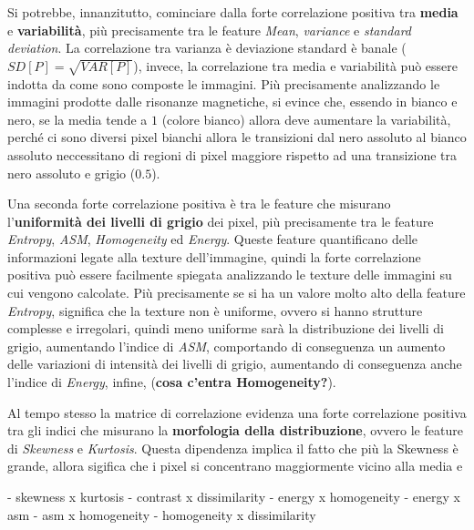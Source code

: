 Si potrebbe, innanzitutto, cominciare dalla forte correlazione positiva
tra \textbf{media} e \textbf{variabilità}, più precisamente tra le feature \textit{Mean},
\textit{variance} e \textit{standard deviation}. La correlazione tra varianza è 
deviazione standard è banale ($SD[P] = \sqrt{VAR[P]}$), invece, la correlazione tra media 
e variabilità può essere indotta da come sono composte le immagini. Più precisamente 
analizzando le immagini prodotte dalle risonanze magnetiche, si evince che, essendo in 
bianco e nero, se la media tende a $1$ (colore bianco) allora deve aumentare la 
variabilità, perché ci sono diversi pixel bianchi allora le transizioni dal nero assoluto
al bianco assoluto neccessitano di regioni di pixel maggiore rispetto ad una 
transizione tra nero assoluto e grigio ($0.5$). 

Una seconda forte correlazione positiva è 
tra le feature che misurano l'\textbf{uniformità dei livelli di grigio} dei pixel,
più precisamente tra le feature \textit{Entropy}, \textit{ASM}, \textit{Homogeneity} 
ed \textit{Energy}. Queste feature quantificano delle informazioni legate alla
texture dell'immagine, quindi la forte correlazione positiva può essere facilmente
spiegata analizzando le texture delle immagini su cui vengono calcolate. Più precisamente
se si ha un valore molto alto della feature \textit{Entropy}, significa che la
texture non è uniforme, ovvero si hanno strutture complesse e irregolari, quindi
meno uniforme sarà la distribuzione dei livelli di grigio, aumentando l'indice
di \textit{ASM}, comportando di conseguenza un aumento delle variazioni di intensità
dei livelli di grigio, aumentando di conseguenza anche l'indice di \textit{Energy},
infine, (\textbf{cosa c'entra Homogeneity?}). 

Al tempo stesso la matrice di correlazione evidenza una forte correlazione positiva
tra gli indici che misurano la \textbf{morfologia della distribuzione}, ovvero 
le feature di \textit{Skewness} e \textit{Kurtosis}. Questa dipendenza implica il 
fatto che più la Skewness è grande, allora sigifica che i pixel si concentrano 
maggiormente vicino alla media e






    - skewness x kurtosis
    - contrast x dissimilarity
    - energy x homogeneity
    - energy x asm
    - asm x homogeneity
    - homogeneity x dissimilarity
